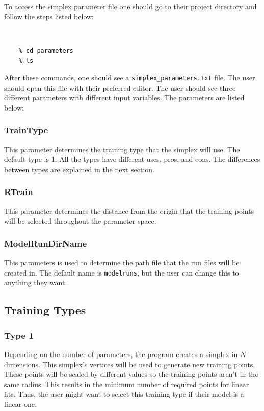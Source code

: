 \documentclass[12pt]{article}
\numberwithin{equation}{section}
\numberwithin{figure}{section}
\begin{document}
To access the simplex parameter file one should go to their project directory and follow the steps listed below:

{\tt
\begin{verbatim}
    % cd parameters 
    % ls
\end{verbatim}
}
After these commands, one should see a {\tt{simplex\_parameters.txt}} file. The user should open this file with their preferred editor. The user should see three different parameters with different input variables. The parameters are listed below:

\subsubsection{TrainType}
This parameter determines the training type that the simplex will use. The default type is 1. All the types have different uses, pros, and cons. The differences between types are explained in the next section.

\subsubsection{RTrain}
This parameter determines the distance from the origin that the training points will be selected throughout the parameter space. 

\subsubsection{ModelRunDirName}
This parameters is used to determine the path file that the run files will be created in. The default name is {\tt{modelruns}}, but the user can change this to anything they want.

\subsection{Training Types}

\subsubsection{Type 1}
 Depending on the number of parameters, the program creates a simplex in $N$ dimensions. This simplex's vertices will be used to generate new training points. These points will be scaled by different values so the training points aren't in the same radius. This results in the minimum number of required points for linear fits. Thus, the user might want to select this training type if their model is a linear one.
\end{document}
